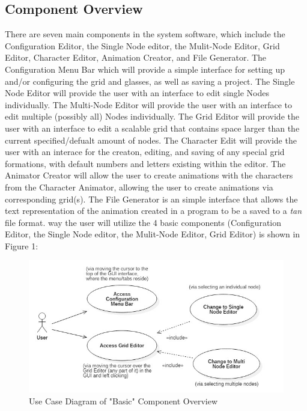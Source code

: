 \documentclass[12pt]{article}
\begin{document}
		\subsection {Component Overview}
		\forceindent There are seven main components in the system software, which include the Configuration Editor, the Single Node editor, the Mulit-Node Editor, Grid Editor, Character Editor, Animation Creator, and File Generator. The Configuration Menu Bar which will provide a simple interface for setting up and/or configuring the grid and glasses, as well as saving a project. The Single Node Editor will provide the user with an interface to edit single Nodes individually. The Multi-Node Editor will provide the user with an interface to edit multiple (possibly all) Nodes individually. The Grid Editor will provide the user with an interface to edit a scalable grid that contains space larger than the current specified/defualt amount of nodes. The Character Edit will provide the user with an interace for the creaton, editing, and saving of any special grid formations, with default numbers and letters existing within the editor. The Animator Creator will allow the user to create animations with the characters from the Character Animator, allowing the user to create animations via corresponding grid(s). The File Generator is an simple interface that allows the text representation of the animation created in a program to be a saved to a \textit{tan} file format. way the user will utilize the 4 basic components (Configuration Editor, the Single Node editor, the Mulit-Node Editor, Grid Editor) is shown in Figure 1:
		
		\begin{figure}[ht!]
			\centering
			\includegraphics[width=170mm]{ComponetOverview.JPG}
			\caption{Use Case Diagram of "Basic" Component Overview \label{overflow}}
		\end{figure}
		
\end{document}
